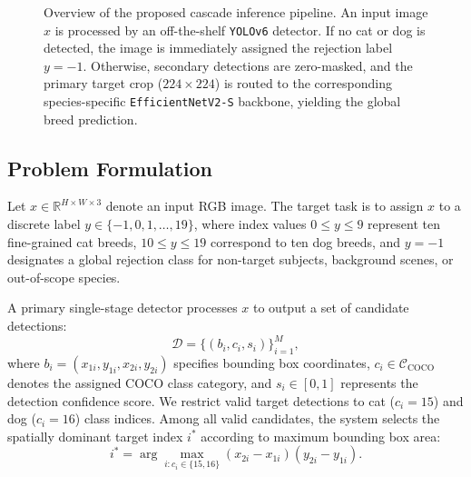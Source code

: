 \begin{figure}[t]
{%
  }
  \caption{Overview of the proposed cascade inference pipeline. An input image $x$ is processed by an off-the-shelf \texttt{YOLOv6} detector. If no cat or dog is detected, the image is immediately assigned the rejection label $y = -1$. Otherwise, secondary detections are zero-masked, and the primary target crop ($224 \times 224$) is routed to the corresponding species-specific \texttt{EfficientNetV2-S} backbone, yielding the global breed prediction.}
  \label{fig:pipeline}
\end{figure}

\subsection{Problem Formulation}
\label{subsec:problem_formulation}

Let $x \in \mathbb{R}^{H \times W \times 3}$ denote an input RGB image. The target task is to assign $x$ to a discrete label $y \in \{-1, 0, 1, \dots, 19\}$, where index values $0 \le y \le 9$ represent ten fine-grained cat breeds, $10 \le y \le 19$ correspond to ten dog breeds, and $y = -1$ designates a global rejection class for non-target subjects, background scenes, or out-of-scope species.

A primary single-stage detector processes $x$ to output a set of candidate detections:
\begin{equation}
  \mathcal{D} = \{(b_i, c_i, s_i)\}_{i=1}^M ,
  \label{eq:detections}
\end{equation}
where $b_i = (x_{1i}, y_{1i}, x_{2i}, y_{2i})$ specifies bounding box coordinates, $c_i \in \mathcal{C}_{\text{COCO}}$ denotes the assigned COCO class category, and $s_i \in [0, 1]$ represents the detection confidence score. We restrict valid target detections to cat ($c_i = 15$) and dog ($c_i = 16$) class indices. Among all valid candidates, the system selects the spatially dominant target index $i^*$ according to maximum bounding box area:
\begin{equation}
  i^* = \arg\max_{i : c_i \in \{15, 16\}} (x_{2i} - x_{1i})(y_{2i} - y_{1i}) .
  \label{eq:largest_box}
\end{equation}

